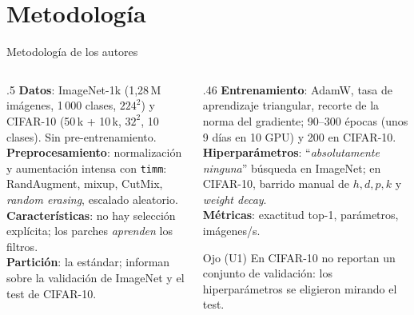 \documentclass[aspectratio=169,xcolor=table]{beamer}
\begin{document}
\section{Metodología}
\begin{frame}{Metodología de los autores}
  \begin{columns}[T]
    \begin{column}{.5\textwidth}
      \small
      \textbf{Datos}: ImageNet-1k (1,28\,M imágenes, 1\,000 clases, $224^2$) y CIFAR-10 (50\,k + 10\,k,
      $32^2$, 10 clases). Sin pre-entrenamiento.\\[3pt]
      \textbf{Preprocesamiento}: normalización y aumentación intensa con \texttt{timm}: RandAugment, mixup,
      CutMix, \emph{random erasing}, escalado aleatorio.\\[3pt]
      \textbf{Características}: no hay selección explícita; los parches \emph{aprenden} los filtros.\\[3pt]
      \textbf{Partición}: la estándar; informan sobre la validación de ImageNet y el test de CIFAR-10.
    \end{column}
    \begin{column}{.46\textwidth}
      \small
      \textbf{Entrenamiento}: AdamW, tasa de aprendizaje triangular, recorte de la norma del gradiente; 90--300
      épocas (unos 9 días en 10 GPU) y 200 en CIFAR-10.\\[3pt]
      \textbf{Hiperparámetros}: ``\emph{absolutamente ninguna}'' búsqueda en ImageNet; en CIFAR-10, barrido manual
      de $h, d, p, k$ y \emph{weight decay}.\\[3pt]
      \textbf{Métricas}: exactitud top-1, parámetros, imágenes/s.
      \begin{alertblock}{Ojo (U1)}
        \footnotesize En CIFAR-10 no reportan un conjunto de validación: los hiperparámetros se eligieron mirando el test.
      \end{alertblock}
    \end{column}
  \end{columns}
\end{frame}

\end{document}

